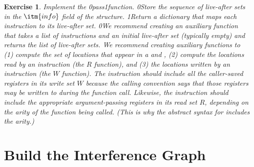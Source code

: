 \documentclass[7x10]{TimesAPriori_MIT}%
\def\racketEd{0}
\def\pythonEd{1}
\providecommand{\BookEdition}{1}
\let\edition\BookEdition
\newcommand{\racket}[1]{{\if\edition\racketEd{#1}\fi}}
\newcommand{\pythonColor}[0]{}
\newcommand{\python}[1]{{\if\edition\pythonEd\pythonColor #1\fi}}
\newtheorem{exercise}[theorem]{Exercise}
\numberwithin{theorem}{chapter}
\numberwithin{definition}{chapter}
\numberwithin{equation}{chapter}
\begin{document}
\begin{exercise}\normalfont\normalsize
  Implement the  \racket{pass}\python{function}.
\racket{Store the sequence of live-after sets in the $\itm{info}$
  field of the \code{Block} structure.}
%
\python{Return a dictionary that maps each instruction to its
  live-after set.}
%
\racket{We recommend creating an auxiliary function that takes a list
  of instructions and an initial live-after set (typically empty) and
  returns the list of live-after sets.}
%
We recommend creating auxiliary functions to (1) compute the set
of locations that appear in a \Src{} and \Dst, (2) compute the locations read
by an instruction (the $R$ function), and (3) the locations written by
an instruction (the $W$ function). The  instruction should
include all the caller-saved registers in its write set $W$ because
the calling convention says that those registers may be written to
during the function call. Likewise, the  instruction
should include the appropriate argument-passing registers in its
read set $R$, depending on the arity of the function being
called. (This is why the abstract syntax for  includes the
arity.)
\end{exercise}


\section{Build the Interference Graph}
\label{sec:build-interference}
\end{document}
